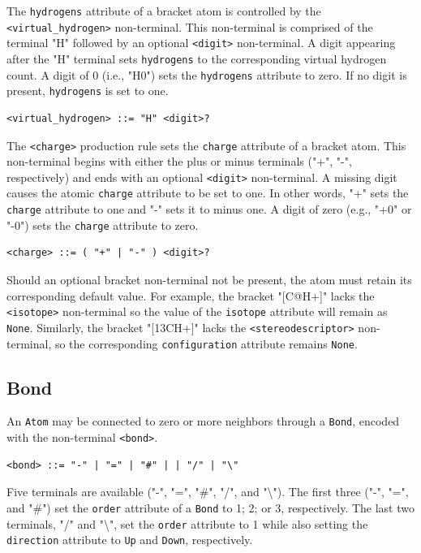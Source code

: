 \documentclass{article}
\def\ttt{\texttt}
\begin{document}
The \ttt{hydrogens} attribute of a bracket atom is controlled by the \\ \ttt{<virtual{\_}hydrogen>} non-terminal. This non-terminal is comprised of the terminal "H" followed by an optional \ttt{<digit>} non-terminal. A digit appearing after the "H" terminal sets \ttt{hydrogens} to the corresponding virtual hydrogen count. A digit of 0 (i.e., "H0") sets the \ttt{hydrogens} attribute to zero. If no digit is present, \ttt{hydrogens} is set to one.

\begin{lstlisting}
<virtual_hydrogen> ::= "H" <digit>?
\end{lstlisting}

The \ttt{<charge>} production rule sets the \ttt{charge} attribute of a bracket atom. This non-terminal begins with either the plus or minus terminals ("+", "-", respectively) and ends with an optional \ttt{<digit>} non-terminal. A missing digit causes the atomic \ttt{charge} attribute to be set to one. In other words, "+" sets the \ttt{charge} attribute to one and "-" sets it to minus one. A digit of zero (e.g., "+0" or "-0") sets the \ttt{charge} attribute to zero.

\begin{lstlisting}
<charge> ::= ( "+" | "-" ) <digit>?
\end{lstlisting}

Should an optional bracket non-terminal not be present, the atom must retain its corresponding default value. For example, the bracket "[C@H+]" lacks the \ttt{<isotope>} non-terminal so the value of the \ttt{isotope} attribute will remain as \ttt{None}. Similarly, the bracket "[13CH+]" lacks the \ttt{<stereodescriptor>} non-terminal, so the corresponding \ttt{configuration} attribute remains \ttt{None}.

\subsection*{Bond}

An \ttt{Atom} may be connected to zero or more neighbors through a \ttt{Bond}, encoded with the non-terminal \ttt{<bond>}.

\begin{lstlisting}
<bond> ::= "-" | "=" | "#" | | "/" | "\"
\end{lstlisting}

Five terminals are available ("-", "=", "\#", "/", and "\textbackslash"). The first three ("-", "=", and "\#") set the \ttt{order} attribute of a \ttt{Bond} to 1; 2; or 3, respectively. The last two terminals, "/" and "\textbackslash", set the \ttt{order} attribute to 1 while also setting the \ttt{direction} attribute to \ttt{Up} and \ttt{Down}, respectively.
\end{document}
